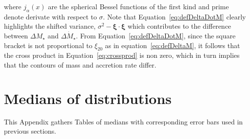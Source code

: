\documentclass[useAMS,usenatbib]{mnras}
\begin{document}
where $j_\alpha(x)$  are the spherical Bessel functions of the first kind and prime denote derivate with respect to $\sigma$. Note that Equation~\eqref{eq:defDeltaDotM}  clearly highlights the shifted variance, $\sigma^2 -\boldsymbol{\xi}\cdot \boldsymbol{\xi}$ which contributes to the difference between $\Delta M_\star$ and $\Delta \dot M_\star$.
From Equation~\eqref{eq:defDeltaDotM}, since the square bracket is not proportional to $\xi_{20}$ as in equation~\eqref{eq:defDeltaM}, it follows that the cross product in Equation~\eqref{eq:crossprod} is non zero, which in turn implies that the contours of mass and accretion rate differ.


\section{Medians of distributions}
\label{sec:appendix_medians}

This Appendix gathers Tables of medians with corresponding error bars used in previous sections.
\end{document}
